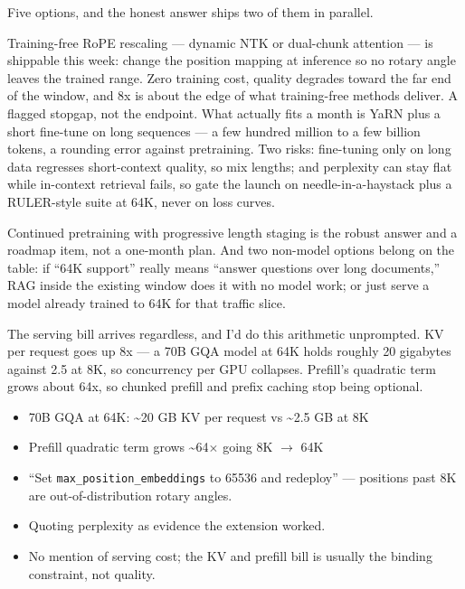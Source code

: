 \documentclass[10pt,twoside]{book}
\newcommand{\lab}[1]{\par\vspace{5pt}\noindent{\sffamily\footnotesize\bfseries\color{accent}#1}\par\vspace{1pt}}
\newcommand{\flab}[1]{\par\vspace{5pt}\noindent{\sffamily\footnotesize\bfseries\color{flag}#1}\par\vspace{1pt}}
\begin{document}
\lab{Say this}
Five options, and the honest answer ships two of them in parallel.\par\vspace{3pt}
Training-free RoPE rescaling --- dynamic NTK or dual-chunk attention --- is shippable this week: change the position mapping at inference so no rotary angle leaves the trained range. Zero training cost, quality degrades toward the far end of the window, and 8x is about the edge of what training-free methods deliver. A flagged stopgap, not the endpoint. What actually fits a month is YaRN plus a short fine-tune on long sequences --- a few hundred million to a few billion tokens, a rounding error against pretraining. Two risks: fine-tuning only on long data regresses short-context quality, so mix lengths; and perplexity can stay flat while in-context retrieval fails, so gate the launch on needle-in-a-haystack plus a RULER-style suite at 64K, never on loss curves.\par\vspace{3pt}
Continued pretraining with progressive length staging is the robust answer and a roadmap item, not a one-month plan. And two non-model options belong on the table: if ``64K support'' really means ``answer questions over long documents,'' RAG inside the existing window does it with no model work; or just serve a model already trained to 64K for that traffic slice.\par\vspace{3pt}
The serving bill arrives regardless, and I'd do this arithmetic unprompted. KV per request goes up 8x --- a 70B GQA model at 64K holds roughly 20 gigabytes against 2.5 at 8K, so concurrency per GPU collapses. Prefill's quadratic term grows about 64x, so chunked prefill and prefix caching stop being optional.\par\vspace{3pt}
\lab{Numbers}
\begin{itemize}
\item 70B GQA at 64K: \textasciitilde{}20 GB KV per request vs \textasciitilde{}2.5 GB at 8K
\item Prefill quadratic term grows \textasciitilde{}64$\times$ going 8K $\to$ 64K
\end{itemize}
\flab{Loses the signal}
\begin{itemize}
\item ``Set \texttt{max\_position\_embeddings} to 65536 and redeploy'' --- positions past 8K are out-of-distribution rotary angles.
\item Quoting perplexity as evidence the extension worked.
\item No mention of serving cost; the KV and prefill bill is usually the binding constraint, not quality.
\end{itemize}
\end{document}

